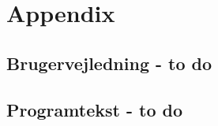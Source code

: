 \documentclass[a4paper]{report}
\begin{document}
\newpage
\section*{Appendix}

\subsection*{Brugervejledning - to do}

\subsection*{Programtekst - to do}
\end{document}
